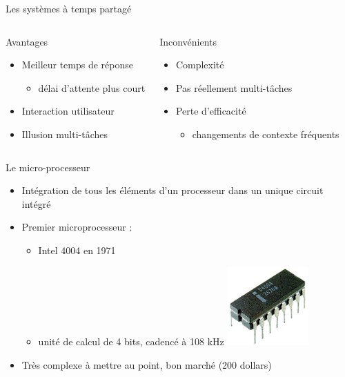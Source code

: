 \begin{frame}{Les systèmes à temps partagé}
\begin{columns}
\begin{block}{Avantages}
\begin{itemize}
\item Meilleur temps de réponse
\begin{itemize}
\item délai d’attente plus court
\end{itemize}
\item Interaction utilisateur
\item Illusion multi-tâches
\end{itemize}
\end{block}
\begin{block}{Inconvénients}
\begin{itemize}
\item Complexité
\item Pas réellement multi-tâches
\item Perte d'efficacité
\begin{itemize}
\item changements de contexte fréquents
\end{itemize}
\end{itemize}
\end{block}
\end{columns}
\end{frame}


\begin{frame}{Le micro-processeur}
\begin{itemize}
\item Intégration de tous les éléments d'un processeur dans un unique circuit intégré
\item Premier microprocesseur :
\begin{itemize}
\item Intel 4004 en 1971
\item unité de calcul de 4 bits, cadencé à 108 kHz
\includegraphics[height=3cm]{../illustration/Intel4004.jpg}
\end{itemize}
\item Très complexe à mettre au point, bon marché (200 dollars)
\end{itemize}
\end{frame}

